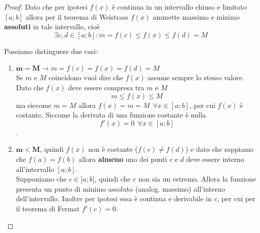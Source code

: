         \begin{proof}
        Dato che per ipotesi $f(x)$ è continua in un intervallo chiuso e limitato $[a;b]$ allora per il teorema di Weistrass $f(x)$ ammette massimo e minimo \textbf{assoluti} in tale intervallo, cioè \[\exists c,d \in [a;b] : m=f(c)\leq f(x)\leq f(d) = M\]
        \begin{figure}
            \centering
        \end{figure}
        Possiamo distinguere due casi:
        \begin{enumerate}
            \item $\mathbf{m=M}\to m=f(c)= f(x)= f(d) = M$\\
            Se $m$ e $M$ coincidono vuol dire che $f(x)$ assume sempre lo stesso valore. Dato che $f(x)$ deve essere compresa tra $m$ e $M$\[m\leq f(x) \leq M\]
            ma siccome $m=M$ allora $f(x)=m=M ~~\forall x \in [a;b]$, per cui $f(x)$ è costante. Siccome la derivata di una funzione costante è nulla \[f'(x)=0~~\forall x \in [a;b]\].
            \item $\mathbf{m<M}$, quindi $f(x)$ non è costante ($f(c)\neq f(d)$) e dato che sappiamo che $f(a)=f(b)$ allora \textbf{almeno} uno dei punti $c$ e $d$ deve essere interno all'intervallo $[a;b]$.\\ Supponiamo che $c\in ]a;b[$, quindi che $c$ non sia un estremo. Allora la funzione presenta un punto di minimo assoluto (analog. massimo) all'interno dell'intervallo. Inoltre per ipotesi essa è continua e derivabile in $c$, per cui per il teorema di Fermat $f'(c)=0$.
        \end{enumerate}
        \end{proof}
